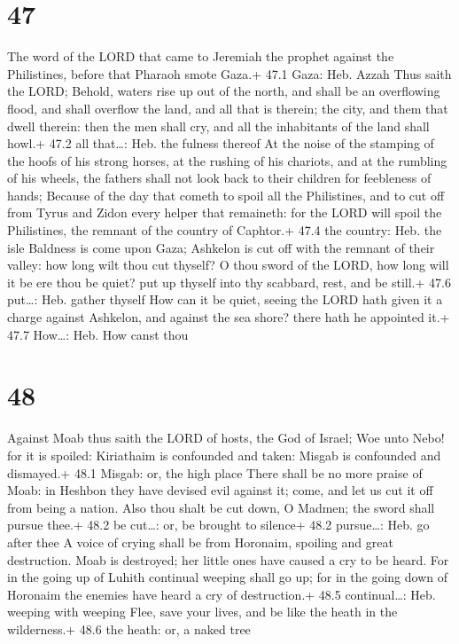 \hypertarget{section-46}{%
\section{47}\label{section-46}}

 The word of the LORD that came to Jeremiah the prophet
against the Philistines, before that Pharaoh smote Gaza.+ 47.1 Gaza:
Heb. Azzah  Thus saith the LORD; Behold, waters rise up out
of the north, and shall be an overflowing flood, and shall overflow the
land, and all that is therein; the city, and them that dwell therein:
then the men shall cry, and all the inhabitants of the land shall howl.+
47.2 all that\ldots: Heb. the fulness thereof  At the noise
of the stamping of the hoofs of his strong horses, at the rushing of his
chariots, and at the rumbling of his wheels, the fathers shall not look
back to their children for feebleness of hands;  Because of
the day that cometh to spoil all the Philistines, and to cut off from
Tyrus and Zidon every helper that remaineth: for the LORD will spoil the
Philistines, the remnant of the country of Caphtor.+ 47.4 the country:
Heb. the isle  Baldness is come upon Gaza; Ashkelon is cut
off with the remnant of their valley: how long wilt thou cut thyself?
 O thou sword of the LORD, how long will it be ere thou be
quiet? put up thyself into thy scabbard, rest, and be still.+ 47.6
put\ldots: Heb. gather thyself  How can it be quiet, seeing
the LORD hath given it a charge against Ashkelon, and against the sea
shore? there hath he appointed it.+ 47.7 How\ldots: Heb. How canst thou

\hypertarget{section-47}{%
\section{48}\label{section-47}}

 Against Moab thus saith the LORD of hosts, the God of
Israel; Woe unto Nebo! for it is spoiled: Kiriathaim is confounded and
taken: Misgab is confounded and dismayed.+ 48.1 Misgab: or, the high
place  There shall be no more praise of Moab: in Heshbon
they have devised evil against it; come, and let us cut it off from
being a nation. Also thou shalt be cut down, O Madmen; the sword shall
pursue thee.+ 48.2 be cut\ldots: or, be brought to silence+ 48.2
pursue\ldots: Heb. go after thee  A voice of crying shall be
from Horonaim, spoiling and great destruction.  Moab is
destroyed; her little ones have caused a cry to be heard. 
For in the going up of Luhith continual weeping shall go up; for in the
going down of Horonaim the enemies have heard a cry of destruction.+
48.5 continual\ldots: Heb. weeping with weeping  Flee, save
your lives, and be like the heath in the wilderness.+ 48.6 the heath:
or, a naked tree


